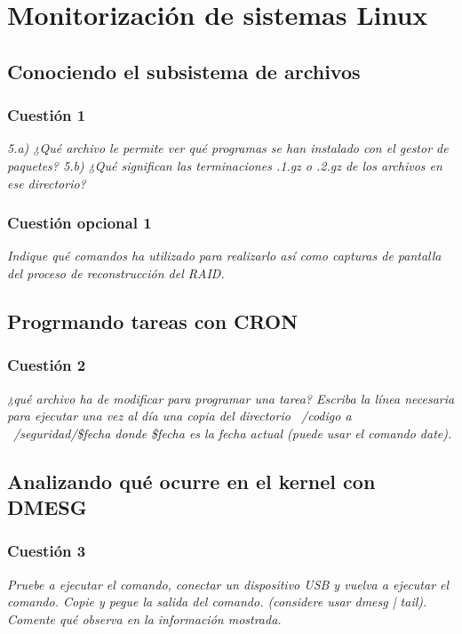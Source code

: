 



\maketitle %
\newpage %
\tableofcontents %
\listoffigures
\newpage

\section{Monitorización de sistemas Linux}
\subsection{Conociendo el subsistema de archivos}
\subsubsection{Cuestión 1}
\textit{5.a) ¿Qué archivo le permite ver qué programas se han instalado con el gestor de paquetes? 5.b) ¿Qué significan las terminaciones .1.gz o .2.gz de los archivos en ese directorio?}
\subsubsection{Cuestión opcional 1}
\textit{Indique qué comandos ha utilizado para realizarlo así como capturas de pantalla del proceso de reconstrucción del RAID.}
\subsection{Progrmando tareas con CRON}
\subsubsection{Cuestión 2}
\textit{¿qué archivo ha de modificar para programar una tarea? Escriba la línea necesaria para ejecutar una vez al día una copia del directorio ~/codigo a ~/seguridad/\$fecha donde \$fecha es la fecha actual (puede usar el comando date).}
\subsection{Analizando qué ocurre en el kernel con DMESG}
\subsubsection{Cuestión 3}
\textit{Pruebe a ejecutar el comando, conectar un dispositivo USB y vuelva a ejecutar el comando. Copie y pegue la salida del comando. (considere usar dmesg | tail). Comente qué observa en la información mostrada.}
